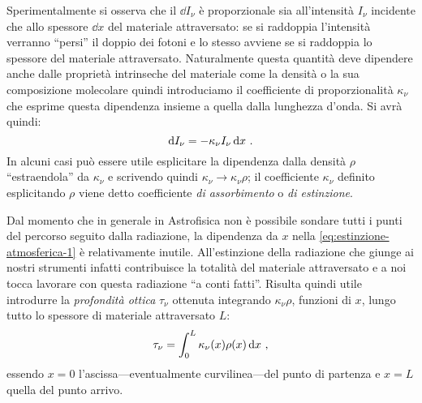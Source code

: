         Sperimentalmente si osserva che il $\dd{I_\nu}$ è proporzionale sia all'intensità $I_\nu$ incidente che allo spessore $\dd{x}$ del materiale attraversato: se si raddoppia l'intensità verranno ``persi'' il doppio dei fotoni e lo stesso avviene se si raddoppia lo spessore del materiale attraversato. Naturalmente questa quantità deve dipendere anche dalle proprietà intrinseche del materiale come la densità o la sua composizione molecolare quindi introduciamo il coefficiente di proporzionalità $\kappa_\nu$ che esprime questa dipendenza insieme a quella dalla lunghezza d'onda. Si avrà quindi:
        \begin{equation}
            \label{eq:estinzione-atmosferica-1}
            \dd{I_\nu} = - \kappa_\nu I_\nu \dd{x}
            \,.
        \end{equation}
        In alcuni casi può essere utile esplicitare la dipendenza dalla densità $\rho$ ``estraendola'' da $\kappa_\nu$ e scrivendo quindi $\kappa_\nu \to \kappa_\nu\rho$; il coefficiente $\kappa_\nu$ definito esplicitando $\rho$ viene detto coefficiente \emph{di assorbimento} o \emph{di estinzione}.

        Dal momento che in generale in Astrofisica non è possibile sondare tutti i punti del percorso seguito dalla radiazione, la dipendenza da $x$ nella \eqref{eq:estinzione-atmosferica-1} è relativamente inutile. All'estinzione della radiazione che giunge ai nostri strumenti infatti contribuisce la totalità del materiale attraversato e a noi tocca lavorare con questa radiazione ``a conti fatti''. Risulta quindi utile introdurre la \emph{profondità ottica} $\tau_\nu$ ottenuta integrando $\kappa_\nu\rho$, funzioni di $x$, lungo tutto lo spessore di materiale attraversato $L$:
        \begin{equation}
            \label{eq:spessore-ottico}
            \tau_\nu = \int_{0}^{L} \kappa_\nu\pqty{x} \rho\pqty{x} \dd{x}
            \mycomma
        \end{equation}
        essendo $x=0$ l'ascissa---eventualmente curvilinea---del punto di partenza e $x=L$ quella del punto arrivo.

